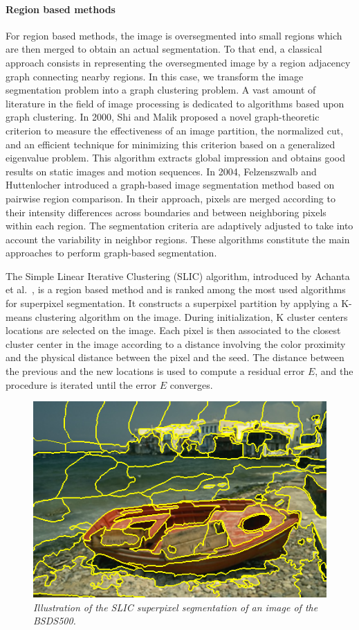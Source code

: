 \documentclass{article}
\begin{document}
            \paragraph{Region based methods} For region based methods, the image is oversegmented into small regions which are then merged to obtain an actual segmentation. To that end, a classical approach consists in representing the oversegmented image by a region adjacency graph connecting nearby regions. In this case, we transform the image segmentation problem into a graph clustering problem. A vast amount of literature in the field of image processing is dedicated to algorithms based upon graph clustering. In 2000, Shi and Malik \cite{shi2000} proposed a novel graph-theoretic criterion to measure the effectiveness of an image partition, the normalized cut, and an efficient technique for minimizing this criterion based on a generalized eigenvalue problem. This algorithm extracts global impression and obtains good results on static images and motion sequences. In 2004, Felzenszwalb and Huttenlocher \cite{felzenszwalb2004} introduced a graph-based image segmentation method based on pairwise region comparison. In their approach, pixels are merged according to their intensity differences across boundaries and between neighboring pixels within each region. The segmentation criteria are adaptively adjusted to take into account the variability in neighbor regions. These algorithms constitute the main approaches to perform graph-based segmentation.
            \par
            The Simple Linear Iterative Clustering (SLIC) algorithm, introduced by Achanta et al.~\cite{achanta2012,achanta2017}, is a region based method and is ranked among the most used algorithms for superpixel segmentation. It constructs a superpixel partition by applying a K-means clustering algorithm on the image. During initialization, K cluster centers locations are selected on the image. Each pixel is then associated to the closest cluster center in the image according to a distance involving the color proximity and the physical distance between the pixel and the seed. The distance between the previous and the new locations is used to compute a residual error $E$, and the procedure is iterated until the error $E$ converges.

            \begin{figure}[!ht]
                \centering
                \includegraphics[width=.5\linewidth]{pics/slic.png}
                \caption{\textit{Illustration of the SLIC superpixel segmentation of an image of the BSDS500.}}
            \end{figure}
\end{document}
